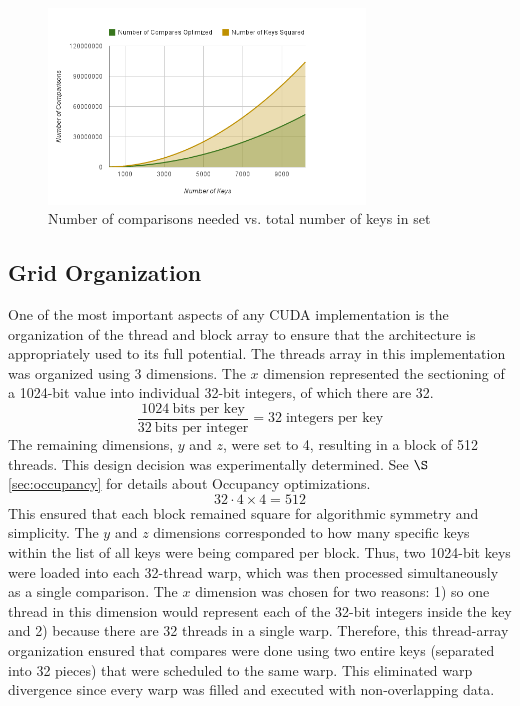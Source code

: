 \documentclass[smallextended]{svjour3}       %
\begin{document}
\begin{figure}
   \centering
   \includegraphics[width=0.75\textwidth]{chart_6}
   \caption{Number of comparisons needed vs. total number of keys in set}
   \label{fig:compvkeys}
\end{figure}

\subsection{Grid Organization}
\label{sec:gridorg}
One of the most important aspects of any CUDA implementation is the 
organization of the thread and block array to ensure that the architecture is 
appropriately used to its full potential. The threads array in this 
implementation was organized using 3 dimensions. The $x$ dimension represented 
the sectioning of a 1024-bit value into individual 32-bit integers, of which 
there are 32. 
\begin{displaymath}
   \frac{1024 \:\mbox{bits per key}}{32 \:\mbox{bits per integer}} = 
   32 \;\mbox{integers per key}
\end{displaymath}
The remaining dimensions, $y$ and $z$, were set to 4, resulting in a block of 
512 threads. This design decision was experimentally determined. See 
$\S$\ref{sec:occupancy} for details about Occupancy optimizations.
\begin{displaymath}
   32 \cdot 4 \times 4 = 512
\end{displaymath}
This ensured that each block remained square for algorithmic 
symmetry and simplicity. The $y$ and $z$ dimensions corresponded to how many 
specific keys within the list of all keys were being compared per block. 
Thus, two 1024-bit keys were loaded into each 32-thread warp, which was 
then processed simultaneously as a single comparison. The $x$ dimension was 
chosen for two reasons: 1) so one thread in this dimension would represent 
each of the 32-bit integers inside the key and 2) because there are 32 threads 
in a single warp. Therefore, this thread-array organization ensured that 
compares were done using two entire keys (separated into 32 pieces) that were 
scheduled to the same warp. This eliminated warp divergence since every warp 
was filled and executed with non-overlapping data.
\end{document}
